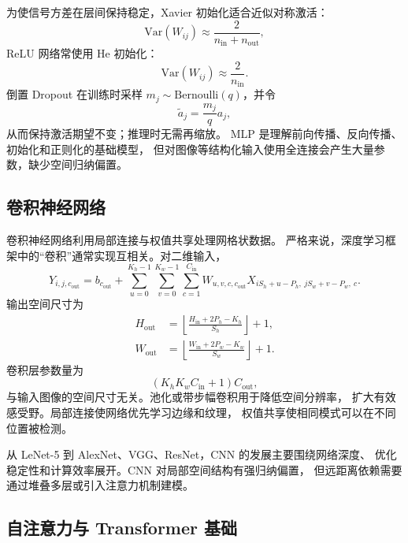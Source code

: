 \documentclass[UTF8,zihao=-4,a4paper,fontset=windows]{ctexart}
\begin{document}
为使信号方差在层间保持稳定，Xavier 初始化适合近似对称激活：
\begin{equation}
  \mathrm{Var}(W_{ij})
  \approx\frac{2}{n_{\mathrm{in}}+n_{\mathrm{out}}},
\end{equation}
ReLU 网络常使用 He 初始化：
\begin{equation}
  \mathrm{Var}(W_{ij})
  \approx\frac{2}{n_{\mathrm{in}}}.
\end{equation}
倒置 Dropout 在训练时采样
$m_j\sim\mathrm{Bernoulli}(q)$，并令
\begin{equation}
  \tilde a_j=\frac{m_j}{q}a_j,
\end{equation}
从而保持激活期望不变；推理时无需再缩放。
MLP 是理解前向传播、反向传播、初始化和正则化的基础模型，
但对图像等结构化输入使用全连接会产生大量参数，缺少空间归纳偏置。

\subsection{卷积神经网络}

卷积神经网络利用局部连接与权值共享处理网格状数据\cite{lecun}。
严格来说，深度学习框架中的“卷积”通常实现互相关。对二维输入，
\begin{equation}
  Y_{i,j,c_{\mathrm{out}}}
  =b_{c_{\mathrm{out}}}
  +\sum_{u=0}^{K_h-1}\sum_{v=0}^{K_w-1}
  \sum_{c=1}^{C_{\mathrm{in}}}
  W_{u,v,c,c_{\mathrm{out}}}
  X_{iS_h+u-P_h,\ jS_w+v-P_w,\ c}.
\end{equation}
输出空间尺寸为
\begin{align}
  H_{\mathrm{out}}
  &=\left\lfloor
  \frac{H_{\mathrm{in}}+2P_h-K_h}{S_h}
  \right\rfloor+1,\\
  W_{\mathrm{out}}
  &=\left\lfloor
  \frac{W_{\mathrm{in}}+2P_w-K_w}{S_w}
  \right\rfloor+1.
\end{align}
卷积层参数量为
\begin{equation}
  (K_hK_wC_{\mathrm{in}}+1)C_{\mathrm{out}},
\end{equation}
与输入图像的空间尺寸无关。池化或带步幅卷积用于降低空间分辨率，
扩大有效感受野。局部连接使网络优先学习边缘和纹理，
权值共享使相同模式可以在不同位置被检测。

从 LeNet-5 到 AlexNet、VGG、ResNet，CNN 的发展主要围绕网络深度、
优化稳定性和计算效率展开。CNN 对局部空间结构有强归纳偏置，
但远距离依赖需要通过堆叠多层或引入注意力机制建模。

\subsection{自注意力与 Transformer 基础}
\end{document}
